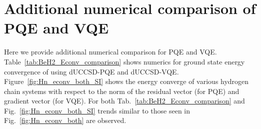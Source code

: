 \documentclass[aps,prx, reprint]{revtex4-2}
\begin{document}
\section{Additional numerical comparison of PQE and VQE}
\label{sec:add_num_vqe_compare}

Here we provide additional numerical comparison for PQE and VQE. 
Table~\ref{tab:BeH2_Econv_comparison} shows numerics for ground state energy convergence of  using dUCCSD-PQE and dUCCSD-VQE. 
Figure~\ref{fig:Hn_econv_both_SI} shows the energy converge of various hydrogen chain systems with respect to the norm of the residual vector (for PQE) and gradient vector (for VQE).
For both Tab.~\ref{tab:BeH2_Econv_comparison} and Fig.~\ref{fig:Hn_econv_both_SI} trends similar to those seen in Fig.~\ref{fig:Hn_econv_both} are observed.
\end{document}
